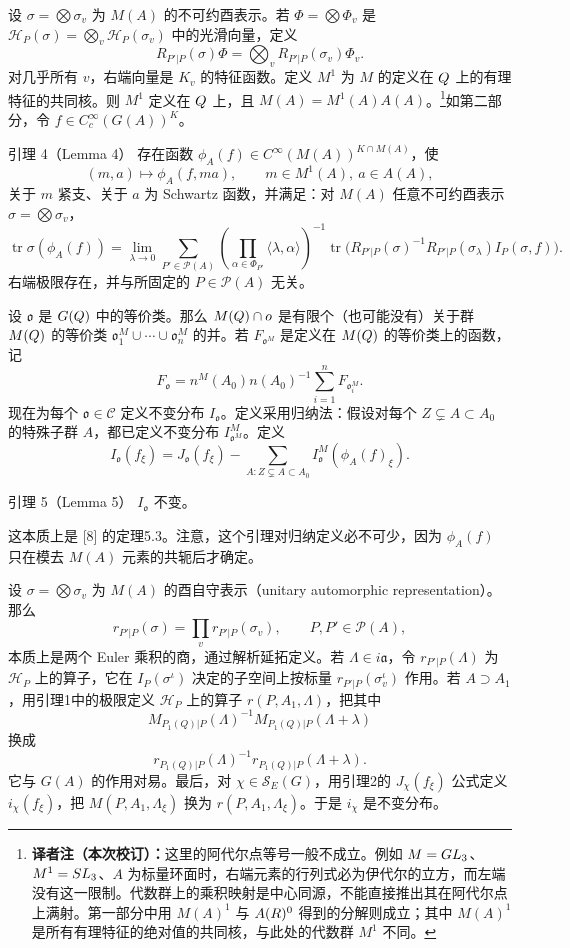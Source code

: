 设 $\sigma=\bigotimes\sigma_v$ 为 $M(A)$ 的不可约酉表示。若
$\Phi=\bigotimes\Phi_v$ 是 $\mathcal H_P(\sigma)=\bigotimes_v\mathcal H_P(\sigma_v)$ 中的光滑向量，定义
\[
 R_{P'|P}(\sigma)\Phi=\bigotimes_vR_{P'|P}(\sigma_v)\Phi_v.
\]
对几乎所有 $v$，右端向量是 $K_v$ 的特征函数。定义 $M^1$ 为 $M$ 的定义在 $Q$ 上的有理特征的共同核。则 $M^1$ 定义在 $Q$ 上，且
$M(A)=M^1(A)A(A)$。\footnote{\textbf{译者注（本次校订）：}这里的阿代尔点等号一般不成立。例如 $M=GL_3$、$M^1=SL_3$、$A$ 为标量环面时，右端元素的行列式必为伊代尔的立方，而左端没有这一限制。代数群上的乘积映射是中心同源，不能直接推出其在阿代尔点上满射。第一部分中用 $M(A)^1$ 与 $A(R)^0$ 得到的分解则成立；其中 $M(A)^1$ 是所有有理特征的绝对值的共同核，与此处的代数群 $M^1$ 不同。}如第二部分，令 $f\in C_c^\infty(G(A))^K$。

\begin{originaltheorem}{引理 4（Lemma 4）}
存在函数 $\phi_A(f)\in C^\infty(M(A))^{K\cap M(A)}$，使
\[
 (m,a)\longmapsto\phi_A(f,ma),\qquad m\in M^1(A),\ a\in A(A),
\]
关于 $m$ 紧支、关于 $a$ 为 Schwartz 函数，并满足：对 $M(A)$ 任意不可约酉表示
$\sigma=\bigotimes\sigma_v$，
\[
 \operatorname{tr}\sigma(\phi_A(f))
 =\lim_{\lambda\to0}\sum_{P'\in\mathcal P(A)}
 \left(\prod_{\alpha\in\Phi_{P'}}\langle\lambda,\alpha\rangle\right)^{-1}
 \operatorname{tr}\bigl(R_{P'|P}(\sigma)^{-1}R_{P'|P}(\sigma_\lambda)I_P(\sigma,f)\bigr).
\]
右端极限存在，并与所固定的 $P\in\mathcal P(A)$ 无关。
\end{originaltheorem}

设 $\mathfrak o$ 是 $G(Q)$ 中的等价类。那么 $M(Q)\cap o$ 是有限个（也可能没有）关于群 $M(Q)$ 的等价类
$\mathfrak o_1^M\cup\cdots\cup\mathfrak o_n^M$ 的并。若 $F_{\mathfrak o^M}$ 是定义在
$M(Q)$ 的等价类上的函数，记
\[
 F_\mathfrak o=n^M(A_0)n(A_0)^{-1}\sum_{i=1}^nF_{\mathfrak o_i^M}.
\]
现在为每个 $\mathfrak o\in\mathcal C$ 定义不变分布 $I_\mathfrak o$。定义采用归纳法：假设对每个
$Z\subsetneq A\subset A_0$ 的特殊子群 $A$，都已定义不变分布 $I_{\mathfrak o^M}^M$。定义
\[
 I_\mathfrak o(f_\xi)=J_\mathfrak o(f_\xi)
 -\sum_{A:Z\subsetneq A\subset A_0}I_\mathfrak o^M(\phi_A(f)_\xi).
\]
\begin{originaltheorem}{引理 5（Lemma 5）}
$I_\mathfrak o$ 不变。
\end{originaltheorem}
这本质上是 [8] 的定理5.3。注意，这个引理对归纳定义必不可少，因为 $\phi_A(f)$ 只在模去
$M(A)$ 元素的共轭后才确定。

设 $\sigma=\bigotimes\sigma_v$ 为 $M(A)$ 的酉自守表示（unitary automorphic representation）。那么
\[
 r_{P'|P}(\sigma)=\prod_vr_{P'|P}(\sigma_v),\qquad P,P'\in\mathcal P(A),
\]
本质上是两个 Euler 乘积的商，通过解析延拓定义。若 $\Lambda\in i\mathfrak a$，令
$r_{P'|P}(\Lambda)$ 为 $\mathcal H_P$ 上的算子，它在 $I_P(\sigma^\iota)$ 决定的子空间上按标量
$r_{P'|P}(\sigma_v^\iota)$ 作用。若 $A\supset A_1$，用引理1中的极限定义
$\mathcal H_P$ 上的算子 $r(P,A_1,\Lambda)$，把其中
\[
 M_{P_1(Q)|P}(\Lambda)^{-1}M_{P_1(Q)|P}(\Lambda+\lambda)
\]
换成
\[
 r_{P_1(Q)|P}(\Lambda)^{-1}r_{P_1(Q)|P}(\Lambda+\lambda).
\]
它与 $G(A)$ 的作用对易。最后，对 $\chi\in\mathcal S_E(G)$，用引理2的
$J_\chi(f_\xi)$ 公式定义 $i_\chi(f_\xi)$，把 $M(P,A_1,\Lambda_\xi)$ 换为
$r(P,A_1,\Lambda_\xi)$。于是 $i_\chi$ 是不变分布。

